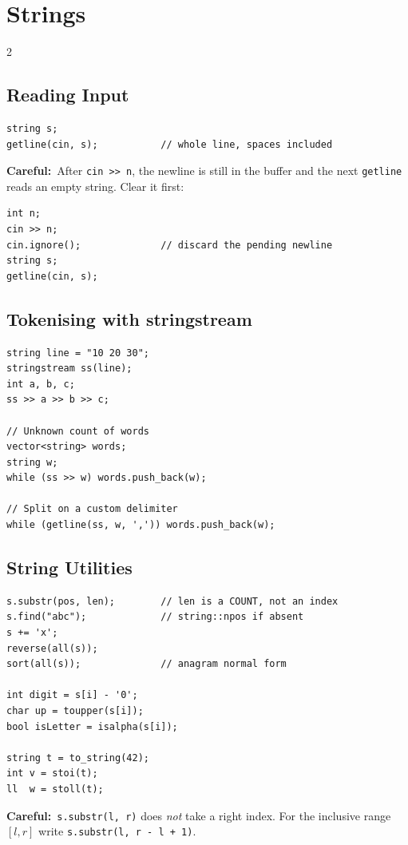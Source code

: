 \documentclass[10pt]{article}
\newcommand{\code}[1]{\texttt{\small #1}}
\newcommand{\warn}[1]{{\color{warnc}\footnotesize\textbf{Careful:}}~{\footnotesize #1}\par}
\begin{document}
\section{Strings}
\begin{multicols}{2}

\subsection{Reading Input}
\begin{lstlisting}
string s;
getline(cin, s);           // whole line, spaces included
\end{lstlisting}
\warn{After \code{cin >> n}, the newline is still in the buffer and the
next \code{getline} reads an empty string. Clear it first:}
\begin{lstlisting}
int n;
cin >> n;
cin.ignore();              // discard the pending newline
string s;
getline(cin, s);
\end{lstlisting}

\subsection{Tokenising with stringstream}
\begin{lstlisting}
string line = "10 20 30";
stringstream ss(line);
int a, b, c;
ss >> a >> b >> c;

// Unknown count of words
vector<string> words;
string w;
while (ss >> w) words.push_back(w);

// Split on a custom delimiter
while (getline(ss, w, ',')) words.push_back(w);
\end{lstlisting}

\subsection{String Utilities}
\begin{lstlisting}
s.substr(pos, len);        // len is a COUNT, not an index
s.find("abc");             // string::npos if absent
s += 'x';
reverse(all(s));
sort(all(s));              // anagram normal form

int digit = s[i] - '0';
char up = toupper(s[i]);
bool isLetter = isalpha(s[i]);

string t = to_string(42);
int v = stoi(t);
ll  w = stoll(t);
\end{lstlisting}
\warn{\code{s.substr(l, r)} does \emph{not} take a right index. For the
inclusive range $[l,r]$ write \code{s.substr(l, r - l + 1)}.}


\end{multicols}
\end{document}
